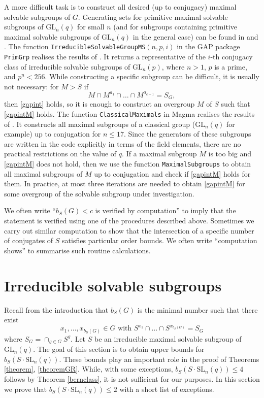 \documentclass[a4paper,reqno,11pt]{amsart}
\theoremstyle{definition}
\theoremstyle{remark}
\numberwithin{equation}{section}
\newcommand{\SL}{{\mathrm{SL}}}
\newcommand{\GL}{{\mathrm{GL}}}
\begin{document}
A more difficult  task is to construct all desired (up to conjugacy) maximal solvable subgroups of $G$.  Generating sets for primitive maximal solvable subgroups of $\GL_n(q)$ for small $n$ (and for subgroups containing primitive maximal solvable subgroups of $\GL_n(q)$ in the general case) can be found in \cite{short} and \cite[\S 21]{sup}. The function \texttt{IrreducibleSolvableGroupMS}$(n,p,i)$ in the {\sf GAP} package \texttt{PrimGrp} \cite{PrimGrp} realises the results of \cite{short}. It returns a representative of the $i$-th conjugacy class of irreducible solvable subgroups of $\GL_n(p)$, where $n>1$, $p$ is a prime, and $p^n < 256$.   While constructing a specific subgroup can be difficult, it is usually not necessary:  for $M>S$ if
\begin{equation}
\label{gapintM}
M \cap M^{a_1} \cap \ldots \cap M^{a_{c-1}} =S_G,
\end{equation}
then \eqref{gapint} holds, so it is enough to construct an overgroup $M$ of $S$ such that \eqref{gapintM} holds.   The function \texttt{ClassicalMaximals} in  {\sc Magma} realises the results of \cite{maxlow}. It  constructs all maximal subgroups of a classical group ($\GL_n(q)$ for example) up to conjugation for $n \le 17$. Since the generators of these subgroups are written in the code explicitly in terms of the field elements, there are no practical restrictions on the value of $q$.  If a maximal subgroup $M$ is too big and \eqref{gapintM} does not hold, then we use the function \texttt{MaximalSubgroups} to obtain all maximal subgroups of $M$ up to conjugation and check if \eqref{gapintM} holds for them. In practice, at most three iterations are needed to obtain \eqref{gapintM} for some overgroup of the solvable subgroup under investigation.



We often write ``$b_S(G)<c$ is verified by computation'' to imply that the statement is verified using one of the procedures described above.   
Sometimes we carry out similar computation to show  that the intersection of a specific number of conjugates of $S$ satisfies particular order bounds.  We often write ``computation shows'' to summarise such routine calculations.

\section{Irreducible solvable subgroups}
\label{ch2}

Recall from the introduction that $b_S(G)$ is the minimal number such that there exist $$x_1, \ldots, x_{b_S(G)} \in G  \text{ with } S^{x_1} \cap \ldots \cap S^{x_{b_S(G)}}=S_G$$ where $S_G= \cap _{g \in G}S^g$. Let $S$ be an irreducible maximal solvable subgroup of $\GL_n(q)$.  The goal of this section is to obtain upper bounds for $b_S(S \cdot \SL_n(q))$. These bounds play an important role in the proof of Theorems \ref{theorem}, \ref{theoremGR}.  While, with some exceptions,  $b_S(S \cdot \SL_n(q)) \le 4$ follows by Theorem \ref{bernclass}, it is not sufficient for our purposes. In this section we prove that  $b_S(S \cdot \SL_n(q)) \le 2$ with a short list of exceptions.
\end{document}
